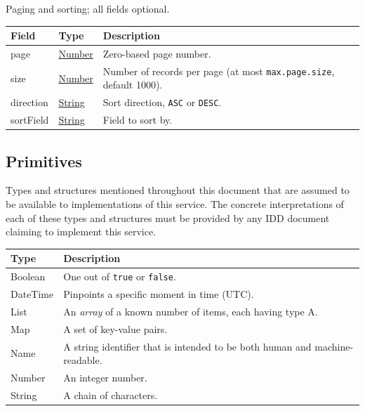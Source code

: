 \documentclass[a4paper]{arrowhead}
\newcommand{\pdef}[1]{{\textcolor{ArrowheadGrey}{#1\label{sec:model:primitives:#1}\label{sec:model:primitives:#1s}\label{sec:model:primitives:#1es}}}}
\newcommand{\pref}[1]{{\textcolor{ArrowheadGrey}{\hyperref[sec:model:primitives:#1]{#1}}}}
\begin{document}

Paging and sorting; all fields optional.


\noindent\begin{tabularx}{\textwidth}{| >{\raggedright\arraybackslash}p{3.9cm} | >{\raggedright\arraybackslash\small}p{5.3cm} | X |} \hline
\rowcolor{gray!33} Field & Type & Description \\ \hline
page & \pref{Number} & Zero-based page number. \\ \hline
size & \pref{Number} & Number of records per page (at most \texttt{max.\allowbreak{}page.\allowbreak{}size}, default 1000). \\ \hline
direction & \pref{String} & Sort direction, \texttt{ASC} or \texttt{DESC}. \\ \hline
sort\allowbreak{}Field & \pref{String} & Field to sort by. \\ \hline
\end{tabularx}



\subsection{Primitives}
\label{sec:model:primitives}

Types and structures mentioned throughout this document that are assumed to be available to implementations of this service.
The concrete interpretations of each of these types and structures must be provided by any IDD document claiming to implement this service.

\noindent\begin{tabularx}{\textwidth}{| p{4.6cm} | X |} \hline
\rowcolor{gray!33} Type & Description \\ \hline
\pdef{Boolean} & One out of \texttt{true} or \texttt{false}. \\ \hline
\pdef{DateTime} & Pinpoints a specific moment in time (UTC). \\ \hline
\pdef{List} & An \textit{array} of a known number of items, each having type A. \\ \hline
\pdef{Map} & A set of key-value pairs. \\ \hline
\pdef{Name} & A string identifier that is intended to be both human and machine-readable. \\ \hline
\pdef{Number} & An integer number. \\ \hline
\pdef{String} & A chain of characters. \\ \hline
\end{tabularx}
\end{document}
